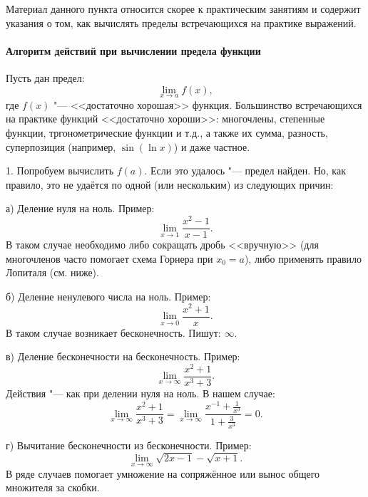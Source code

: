 Материал данного пункта относится скорее к практическим занятиям
и содержит указания о том, как вычислять пределы встречающихся на практике выражений.

\paragraph{Алгоритм действий при вычислении предела функции}
Пусть дан предел:
\begin{equation}
	\lim_{x\to a} f(x)
	,
\end{equation}
где $f(x)$ "--- <<достаточно хорошая>> функция.
Большинство встречающихся на практике функций <<достаточно хороши>>:
многочлены, степенные функции, тргонометрические функции и т.д.,
а также их сумма, разность, суперпозиция (например, $\sin (\ln x)$) и даже частное.

1. Попробуем вычислить $f(a)$.
Если это удалось "--- предел найден.
Но, как правило, это не удаётся по одной (или нескольким) из следующих причин:

а) Деление нуля на ноль. Пример:
\begin{equation}
	\lim_{x\to 1} \frac{x^2-1}{x-1}
	.
\end{equation}
В таком случае необходимо либо сокращать дробь <<вручную>> (для многочленов часто помогает схема Горнера при $x_0 = a$),
либо применять правило Лопиталя (см. ниже).


б) Деление ненулевого числа на ноль. Пример:
\begin{equation}
	\lim_{x\to 0} \frac{x^2+1}{x}
	.
\end{equation}
В таком случае возникает бесконечность. Пишут: $\infty$.

в) Деление бесконечности на бесконечность. Пример:
\begin{equation}
	\lim_{x\to \infty} \frac{x^2+1}{x^3+3}
	.
\end{equation}
Действия "--- как при делении нуля на ноль.
В нашем случае:
\begin{equation}
	\lim_{x\to \infty} \frac{x^2+1}{x^3+3}
	=
	\lim_{x\to \infty} \frac{x^{-1}+\frac1{x^3}}{1+\frac{3}{x^3}}
	=
	0
	.
\end{equation}

г) Вычитание бесконечности из бесконечности. Пример:
\begin{equation}
	\lim_{x\to \infty} \sqrt{2x-1} - \sqrt{x+1}
	.
\end{equation}
В ряде случаев помогает умножение на сопряжённое или вынос общего множителя за скобки.


